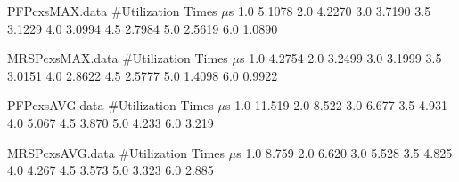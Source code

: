 \begin{filecontents}{PFPcxsMAX.data}
#Utilization   Times $\mu$s
1.0  5.1078
2.0  4.2270
3.0  3.7190
3.5  3.1229
4.0  3.0994
4.5  2.7984
5.0  2.5619
6.0  1.0890
\end{filecontents}

\begin{filecontents}{MRSPcxsMAX.data}
#Utilization   Times $\mu$s
1.0  4.2754
2.0  3.2499
3.0  3.1999
3.5  3.0151
4.0  2.8622
4.5  2.5777
5.0  1.4098
6.0  0.9922
\end{filecontents}

\begin{filecontents}{PFPcxsAVG.data}
#Utilization   Times $\mu$s
1.0  11.519
2.0  8.522
3.0  6.677
3.5  4.931
4.0  5.067
4.5  3.870
5.0  4.233 
6.0  3.219
\end{filecontents}

\begin{filecontents}{MRSPcxsAVG.data}
#Utilization   Times $\mu$s
1.0  8.759
2.0  6.620
3.0  5.528
3.5  4.825
4.0  4.267
4.5  3.573
5.0  3.323
6.0  2.885
\end{filecontents}
